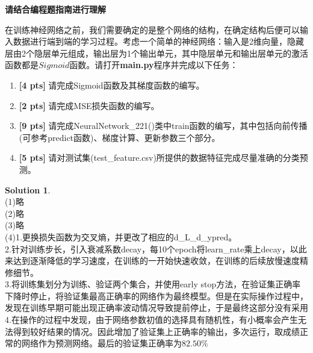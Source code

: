 \documentclass[a4paper,UTF8]{article}
\theoremstyle{definition}
\newtheorem*{solution}{Solution}
\begin{document}
\textbf{请结合编程题指南进行理解}
\par 在训练神经网络之前，我们需要确定的是整个网络的结构，在确定结构后便可以输入数据进行端到端的学习过程。考虑一个简单的神经网络：输入是2维向量，隐藏层由2个隐层单元组成，输出层为1个输出单元，其中隐层单元和输出层单元的激活函数都是$Sigmoid$函数。请打开\textbf{main.py}程序并完成以下任务：
\begin{enumerate}[(1)]
	\item \textbf{[4 pts]} 请完成Sigmoid函数及其梯度函数的编写。
	\item \textbf{[2 pts]} 请完成MSE损失函数的编写。
	\item \textbf{[9 pts]} 请完成NeuralNetwork\_221()类中train函数的编写，其中包括向前传播(可参考predict函数)、梯度计算、更新参数三个部分。
	\item \textbf{[5 pts]} 请对测试集(test\_feature.csv)所提供的数据特征完成尽量准确的分类预测。
\end{enumerate}

\begin{solution}\ \\
(1)略\\
(2)略\\
(3)略\\
(4)1.更换损失函数为交叉熵，并更改了相应的d\_L\_d\_ypred。\\
2.针对训练步长，引入衰减系数decay，每10个epoch将learn\_rate乘上decay，以此来达到逐渐降低的学习速度，在训练的一开始快速收敛，在训练的后续放慢速度精修细节。\\
3.将训练集划分为训练、验证两个集合，并使用early stop方法，在验证集正确率下降时停止，将验证集最高正确率的网络作为最终模型。但是在实际操作过程中，发现在训练早期可能出现正确率波动情况导致提前停止，于是最终这部分没有采用\\
4.在操作的过程中发现，由于网络参数初值的选择具有随机性，有小概率会产生无法得到较好结果的情况。因此增加了验证集上正确率的输出，多次运行，取成绩正常的网络作为预测网络。最后的验证集正确率为$82.50\%$

\end{solution}
\end{document}
